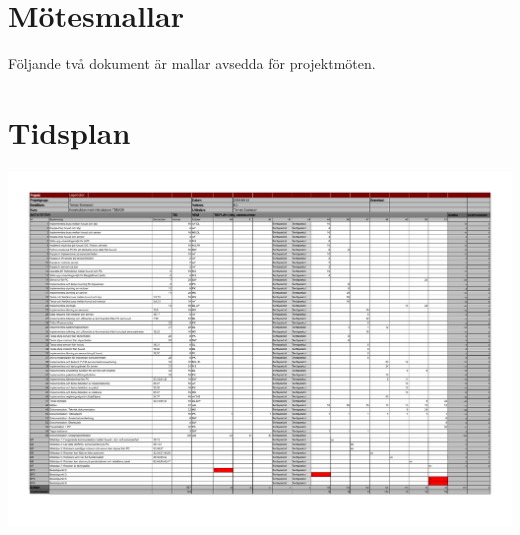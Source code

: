 \documentclass[titlepage, a4paper]{article}
\begin{document}
\newpage
\begin{appendices}


\section{Mötesmallar} \label{ap:motesmall}
Följande två dokument är mallar avsedda för projektmöten. 






\newpage
\section{Tidsplan} \label{ap:tidsplan}
\includegraphics[angle=90, scale=0.7]{../tidsplan/tidsplan_v0.3.pdf}

\end{appendices}
\end{document}

